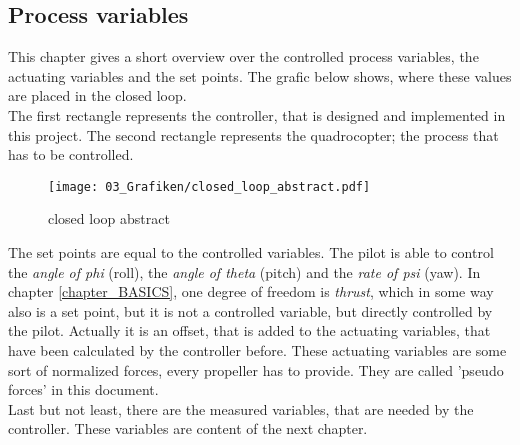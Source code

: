 \subsection{Process variables}\label{chapter_VARIABLES}
This chapter gives a short overview over the controlled process variables, the actuating variables and the set points. The grafic below shows, where these values are placed in the closed loop. \\
The first rectangle represents the controller, that is designed and implemented in this project. The second rectangle represents the quadrocopter; the process that has to be controlled.
\begin{figure}[H]
	\centering
		\texttt{[image: 03\_Grafiken/closed\_loop\_abstract.pdf]}
	\caption{closed loop abstract}
	\label{fig:closed loop abstract}
\end{figure}
The set points are equal to the controlled variables. The pilot is able to control the \textit{angle of phi} (roll), the \textit{angle of theta} (pitch) and the \textit{rate of psi} (yaw). In chapter \ref{chapter_BASICS}, one degree of freedom is \textit{thrust}, which in some way also is a set point, but it is not a controlled variable, but directly controlled by the pilot. Actually it is an offset, that is added to the actuating variables, that have been calculated by the controller before.
These actuating variables are some sort of normalized forces, every propeller has to provide. They are called 'pseudo forces' in this document. \\
Last but not least, there are the measured variables, that are needed by the controller. These variables are content of the next chapter.